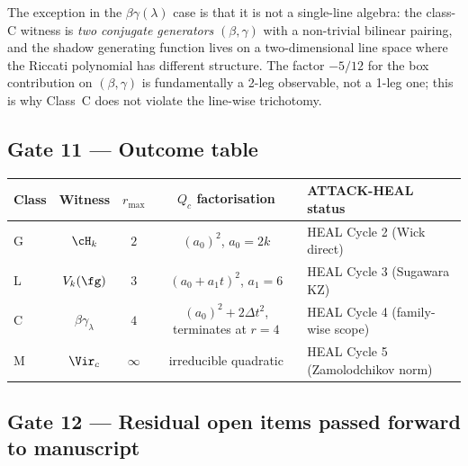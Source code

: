 The exception in the $\beta\gamma(\lambda)$ case is that it is not
a single-line algebra: the class-C witness is \emph{two conjugate
generators} $(\beta, \gamma)$ with a non-trivial bilinear pairing,
and the shadow generating function lives on a two-dimensional
line space where the Riccati polynomial has different
structure. The factor $-5/12$ for the box contribution on
$(\beta, \gamma)$ is fundamentally a 2-leg observable, not a 1-leg
one; this is why Class~C does not violate the line-wise trichotomy.

\subsection*{Gate 11 --- Outcome table}

\begin{center}
\begin{tabular}{l|c|c|c|l}
\textbf{Class} & \textbf{Witness} & $r_{\max}$ & $Q_c$ factorisation
 & ATTACK-HEAL status \\
\hline
G & $\cH_k$ & $2$ & $(a_0)^2$, $a_0 = 2k$
  & HEAL Cycle 2 (Wick direct) \\
L & $V_k(\fg)$ & $3$ & $(a_0 + a_1 t)^2$, $a_1 = 6$
  & HEAL Cycle 3 (Sugawara KZ) \\
C & $\beta\gamma_\lambda$ & $4$ & $(a_0)^2 + 2\Delta t^2$,
   terminates at $r = 4$
  & HEAL Cycle 4 (family-wise scope) \\
M & $\Vir_c$ & $\infty$ & irreducible quadratic
  & HEAL Cycle 5 (Zamolodchikov norm) \\
\end{tabular}
\end{center}

\subsection*{Gate 12 --- Residual open items passed forward to manuscript}

